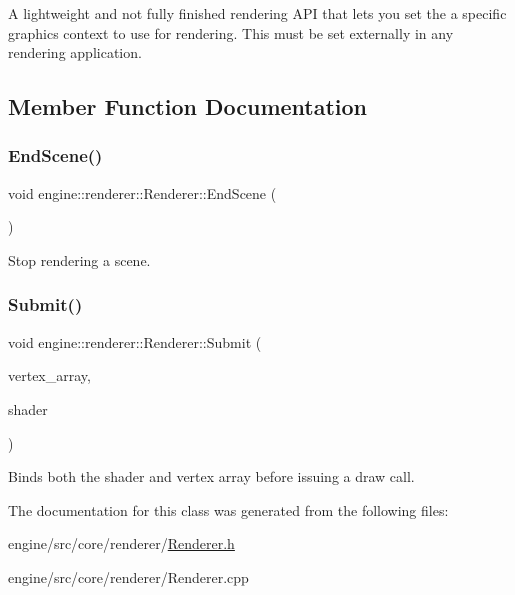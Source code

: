 A lightweight and not fully finished rendering A\+PI that lets you set the a specific graphics context to use for rendering. This must be set externally in any rendering application. 

\subsection{Member Function Documentation}
\mbox{\label{classengine_1_1renderer_1_1Renderer_aabecab3b2aea9d925bd7449c7f85539b}} 
\subsubsection{\texorpdfstring{End\+Scene()}{EndScene()}}
{\footnotesize\ttfamily void engine\+::renderer\+::\+Renderer\+::\+End\+Scene (\begin{DoxyParamCaption}{ }\end{DoxyParamCaption})\hspace{0.3cm}{\ttfamily [static]}}

Stop rendering a scene. \mbox{\label{classengine_1_1renderer_1_1Renderer_a1d894d1fa8231d1c4016fba0e1aaab3e}} 
\subsubsection{\texorpdfstring{Submit()}{Submit()}}
{\footnotesize\ttfamily void engine\+::renderer\+::\+Renderer\+::\+Submit (\begin{DoxyParamCaption}\item[{const std\+::shared\+\_\+ptr$<$ \hyperlink{classengine_1_1renderer_1_1VertexArray}{Vertex\+Array} $>$ \&}]{vertex\+\_\+array,  }\item[{const std\+::shared\+\_\+ptr$<$ \hyperlink{classengine_1_1renderer_1_1Shader}{Shader} $>$ \&}]{shader }\end{DoxyParamCaption})\hspace{0.3cm}{\ttfamily [static]}}

Binds both the shader and vertex array before issuing a draw call. 

The documentation for this class was generated from the following files\+:\begin{DoxyCompactItemize}
\item 
engine/src/core/renderer/\hyperlink{Renderer_8h}{Renderer.\+h}\item 
engine/src/core/renderer/Renderer.\+cpp\end{DoxyCompactItemize}
